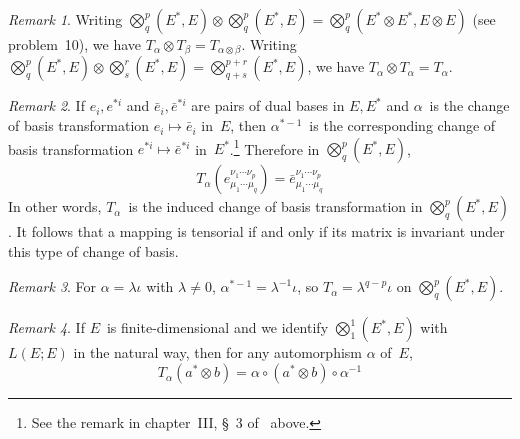 \documentclass[letterpaper,12pt]{article}
\newcommand{\after}{\circ}
\newcommand{\tprod}{\otimes}
\newcommand{\bigtprod}{\bigotimes}
\newcommand{\medtprod}{{\textstyle\bigtprod}}
\theoremstyle{definition}
\theoremstyle{remark}
\newtheorem*{rmk}{Remark}
\begin{document}
\begin{rmk}
Writing \(\medtprod^p_q(E^*,E)\tprod\medtprod^p_q(E^*,E)=\medtprod^p_q(E^*\tprod E^*,E\tprod E)\) (see problem~10), we have \(T_{\alpha}\tprod T_{\beta}=T_{\alpha\tprod\beta}\). Writing \(\medtprod^p_q(E^*,E)\tprod\medtprod^r_s(E^*,E)=\medtprod^{p+r}_{q+s}(E^*,E)\), we have \(T_{\alpha}\tprod T_{\alpha}=T_{\alpha}\).
\end{rmk}

\begin{rmk}
If \(e_i,e^{*i}\) and \(\bar{e}_i,\bar{e}^{*i}\) are pairs of dual bases in \(E,E^*\) and \(\alpha\)~is the change of basis transformation \(e_i\mapsto\bar{e}_i\) in~\(E\), then \(\alpha^{*-1}\)~is the corresponding change of basis transformation \(e^{*i}\mapsto\bar{e}^{*i}\) in~\(E^*\).\footnote{See the remark in chapter~III, \S~3 of~\cite{greub1} above.} Therefore in \(\medtprod^p_q(E^*,E)\),
\[T_{\alpha}(e^{\nu_1\cdots\nu_p}_{\mu_1\cdots\mu_q})=\bar{e}^{\nu_1\cdots\nu_p}_{\mu_1\cdots\mu_q}\]
In other words, \(T_{\alpha}\)~is the induced change of basis transformation in \(\medtprod^p_q(E^*,E)\). It follows that a mapping is tensorial if and only if its matrix is invariant under this type of change of basis.
\end{rmk}

\begin{rmk}
For \(\alpha=\lambda\iota\) with \(\lambda\ne0\), \(\alpha^{*-1}=\lambda^{-1}\iota\), so \(T_{\alpha}=\lambda^{q-p}\iota\) on \(\medtprod^p_q(E^*,E)\).
\end{rmk}

\begin{rmk}
If \(E\)~is finite-dimensional and we identify \(\medtprod^1_1(E^*,E)\) with \(L(E;E)\) in the natural way, then for any automorphism \(\alpha\) of~\(E\),
\[T_{\alpha}(a^*\tprod b)=\alpha\after(a^*\tprod b)\after\alpha^{-1}\]
\end{rmk}
\end{document}
